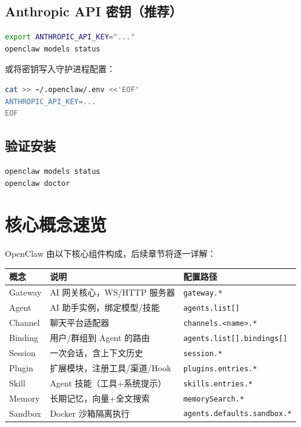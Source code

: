 \subsection{Anthropic API 密钥（推荐）}

\begin{lstlisting}[language=bash]
export ANTHROPIC_API_KEY="..."
openclaw models status
\end{lstlisting}

或将密钥写入守护进程配置：

\begin{lstlisting}[language=bash]
cat >> ~/.openclaw/.env <<'EOF'
ANTHROPIC_API_KEY=...
EOF
\end{lstlisting}

\subsection{验证安装}

\begin{lstlisting}[language=bash]
openclaw models status
openclaw doctor
\end{lstlisting}

\section{核心概念速览}

OpenClaw 由以下核心组件构成，后续章节将逐一详解：

\begin{center}
\begin{tabular}{lll}
\toprule
\textbf{概念} & \textbf{说明} & \textbf{配置路径} \\
\midrule
Gateway & AI 网关核心，WS/HTTP 服务器 & \texttt{gateway.*} \\
Agent & AI 助手实例，绑定模型/技能 & \texttt{agents.list[]} \\
Channel & 聊天平台适配器 & \texttt{channels.<name>.*} \\
Binding & 用户/群组到 Agent 的路由 & \texttt{agents.list[].bindings[]} \\
Session & 一次会话，含上下文历史 & \texttt{session.*} \\
Plugin & 扩展模块，注册工具/渠道/Hook & \texttt{plugins.entries.*} \\
Skill & Agent 技能（工具+系统提示） & \texttt{skills.entries.*} \\
Memory & 长期记忆，向量+全文搜索 & \texttt{memorySearch.*} \\
Sandbox & Docker 沙箱隔离执行 & \texttt{agents.defaults.sandbox.*} \\
\bottomrule
\end{tabular}
\end{center}


